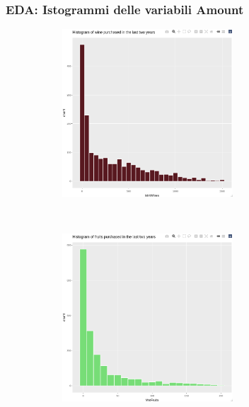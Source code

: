 \begin{frame}[fragile]
\frametitle{EDA: Istogrammi delle variabili Amount}

    \begin{figure}
    \centering
        \begin{minipage}{.3\textwidth}
            \begin{subfigure}{\textwidth}
            \centering
            \includegraphics[width=0.7\textwidth]{Img/eda/EDA018.png}
            \end{subfigure}\\
            \begin{subfigure}{\textwidth}
            \centering
            \includegraphics[width=0.7\textwidth]{Img/eda/EDA019.png}
            \end{subfigure}%
        \end{minipage}

\end{figure}
\end{frame}
